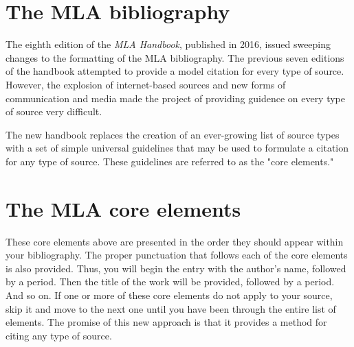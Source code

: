 \newpage

\section{The MLA bibliography}

The eighth edition of the \emph{MLA Handbook}, published in 2016, issued sweeping changes to the formatting of the MLA bibliography. The previous seven editions of the handbook attempted to provide a model citation for every type of source. However, the explosion of internet-based sources and new forms of communication and media made the project of providing guidence on every type of source very difficult.  

The new handbook replaces the creation of an ever-growing list of source types with a set of simple universal guidelines that may be used to formulate a citation for any type of source. These guidelines are referred to as the "core elements."

\section{The MLA core elements}




These core elements above are presented in the order they should appear within your bibliography. The proper punctuation that follows each of the core elements is also provided. Thus, you will begin the entry with the author's name, followed by a period. Then the title of the work will be provided, followed by a period. And so on. If one or more of these core elements do not apply to your source, skip it and move to the next one until you have been through the entire list of elements. The promise of this new approach is that it provides a method for citing any type of source.

